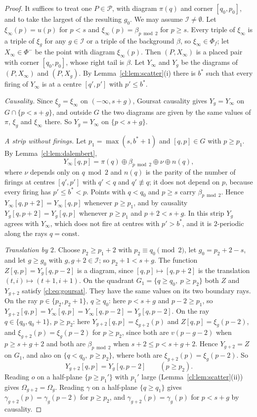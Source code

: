 \begin{proof}
It suffices to treat one $P\in\mathcal P$, with diagram $\pi(q)$ and corner $[q_0,p_0]$, and to take the largest of the resulting $g_0$. We may assume $\mathcal I\ne\emptyset$. Let $\xi_\infty(p)=u(p)$ for $p<s$ and $\xi_\infty(p)=\beta_{p\bmod2}$ for $p\ge s$. Every triple of $\xi_\infty$ is a triple of $\xi_g$ for any $g\in\mathcal I$ or a triple of the background $\beta$, so $\xi_\infty\in\Phi_f$; let $X_\infty\in\Phi^-$ be the point with diagram $\xi_\infty(p)$. Then $(P,X_\infty)$ is a placed pair with corner $[q_0,p_0]$, whose right tail is $\beta$. Let $Y_\infty$ and $Y_g$ be the diagrams of $(P,X_\infty)$ and $(P,X_g)$. By Lemma~\ref{cl:lem:scatter}(i) there is $b^*$ such that every firing of $Y_\infty$ is at a centre $[q',p']$ with $p'\le b^*$.

\emph{Causality.} Since $\xi_g=\xi_\infty$ on $(-\infty,s+g)$, Goursat causality gives $Y_g=Y_\infty$ on $G\cap\{p<s+g\}$, and outside $G$ the two diagrams are given by the same values of $\pi$, $\xi_g$ and $\xi_\infty$ there. So $Y_g=Y_\infty$ on $\{p<s+g\}$.

\emph{A strip without firings.} Let $p_1=\max(s,b^*+1)$ and $[q,p]\in G$ with $p\ge p_1$. By Lemma~\ref{cl:lem:dalembert},
\[
Y_\infty[q,p]=\pi(q)\oplus\beta_{p\bmod2}\oplus\nu\oplus n(q),
\]
where $\nu$ depends only on $q\bmod 2$ and $n(q)$ is the parity of the number of firings at centres $[q',p']$ with $q'<q$ and $q'\not\equiv q$; it does not depend on $p$, because every firing has $p'\le b^*<p$. Points with $q<q_0$ and $p\ge s$ carry $\beta_{p\bmod2}$. Hence $Y_\infty[q,p+2]=Y_\infty[q,p]$ whenever $p\ge p_1$, and by causality $Y_g[q,p+2]=Y_g[q,p]$ whenever $p\ge p_1$ and $p+2<s+g$. In this strip $Y_g$ agrees with $Y_\infty$, which does not fire at centres with $p'>b^*$, and it is $2$-periodic along the rays $q=\mathrm{const}$.

\emph{Translation by $2$.} Choose $p_2\ge p_1+2$ with $p_2\equiv q_0\pmod 2$, let $g_0=p_2+2-s$, and let $g\ge g_0$ with $g,g+2\in\mathcal I$; so $p_2+1<s+g$. The function $Z[q,p]=Y_g[q,p-2]$ is a diagram, since $[q,p]\mapsto[q,p+2]$ is the translation $(t,i)\mapsto(t+1,i+1)$. On the quadrant $G_1=\{q\ge q_0,\ p\ge p_2\}$ both $Z$ and $Y_{g+2}$ satisfy \eqref{cl:eq:goursat}. They have the same values on its two boundary rays. On the ray $p\in\{p_2,p_2+1\}$, $q\ge q_0$: here $p<s+g$ and $p-2\ge p_1$, so $Y_{g+2}[q,p]=Y_\infty[q,p]=Y_\infty[q,p-2]=Y_g[q,p-2]$. On the ray $q\in\{q_0,q_0+1\}$, $p\ge p_2$: here $Y_{g+2}[q,p]=\xi_{g+2}(p)$ and $Z[q,p]=\xi_g(p-2)$, and $\xi_{g+2}(p)=\xi_g(p-2)$ for $p\ge p_2$, since both are $v(p-g-2)$ when $p\ge s+g+2$ and both are $\beta_{p\bmod2}$ when $s+2\le p<s+g+2$. Hence $Y_{g+2}=Z$ on $G_1$, and also on $\{q<q_0,\ p\ge p_2\}$, where both are $\xi_{g+2}(p)=\xi_g(p-2)$. So
\[
Y_{g+2}[q,p]=Y_g[q,p-2]\qquad(p\ge p_2).
\]
Reading $o$ on a half-plane $\{p\ge p_1'\}$ with $p_1'$ large (Lemma~\ref{cl:lem:scatter}(ii)) gives $\Omega_{g+2}=\Omega_g$. Reading $\gamma$ on a half-plane $\{q\ge q_1\}$ gives $\gamma_{g+2}(p)=\gamma_g(p-2)$ for $p\ge p_2$, and $\gamma_{g+2}(p)=\gamma_g(p)$ for $p<s+g$ by causality.
\end{proof}

